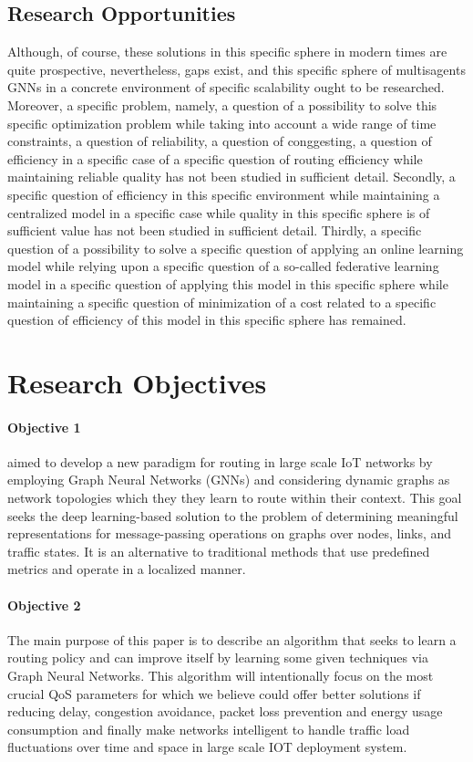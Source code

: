\documentclass[a4paper,fleqn]{cas-dc}
\numberwithin{equation}{section}
\begin{document}
\subsection{Research Opportunities}
Although, of course, these solutions in this specific sphere in modern times are quite prospective, nevertheless, gaps exist, and this specific sphere of multisagents GNNs in a concrete environment of specific scalability ought to be researched. Moreover, a specific problem, namely, a question of a possibility to solve this specific optimization problem while taking into account a wide range of time constraints, a question of reliability, a question of conggesting, a question of efficiency in a specific case of a specific question of routing efficiency while maintaining reliable quality has not been studied in sufficient detail. Secondly, a specific question of efficiency in this specific environment while maintaining a centralized model in a specific case while quality in this specific sphere is of sufficient value has not been studied in sufficient detail. Thirdly, a specific question of a possibility to solve a specific question of applying an online learning model while relying upon a specific question of a so-called federative learning model in a specific question of applying this model in this specific sphere while maintaining a specific question of minimization of a cost related to a specific question of efficiency of this model in this specific sphere has remained.
\section{Research Objectives}
\paragraph{Objective 1}
\cite{Bernardez2023494,Li2025}
aimed to develop a new paradigm for routing in large scale IoT networks by employing Graph Neural Networks (GNNs) and considering dynamic graphs as network topologies which they they learn to route within their context. This goal seeks the deep learning-based solution to the problem of determining meaningful representations for message-passing operations on graphs over nodes, links, and traffic states. It is an alternative to traditional methods that use predefined metrics and operate in a localized manner.

\paragraph{Objective 2}
\cite{Islam2024111169,Pehlivan2025}
The main purpose of this paper is to describe an algorithm that seeks to learn a routing policy and can improve itself by learning some given techniques via Graph Neural Networks. This algorithm will intentionally focus on the most crucial QoS parameters for which we believe could offer better solutions if reducing delay, congestion avoidance, packet loss prevention and energy usage consumption and finally make networks intelligent to handle traffic load fluctuations over time and space in large scale IOT deployment system.
\end{document}
